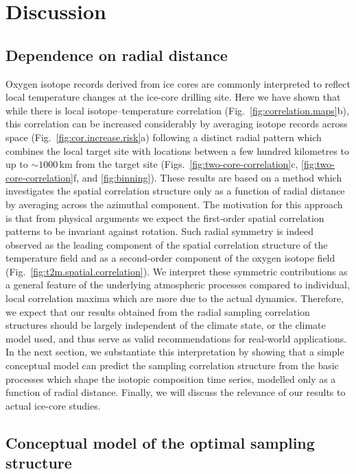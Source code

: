 \documentclass[cp]{copernicus}
\begin{document}
\section{Discussion}\label{discussion}

\subsection{Dependence on radial distance}
\label{discussion:radial.dependence}

Oxygen isotope records derived from ice cores are commonly interpreted to
reflect local temperature changes at the ice-core drilling site. Here we have
shown that while there is local isotope--temperature correlation
(Fig.~\ref{fig:correlation.maps}b), this correlation can be increased
considerably by averaging isotope records across space
(Fig.~\ref{fig:cor.increase.risk}a) following a distinct radial pattern which
combines the local target site with locations between a few hundred kilometres
to up to $\sim1000$\,km from the target site
(Figs.~\ref{fig:two-core-correlation}c, \ref{fig:two-core-correlation}f, and
\ref{fig:binning}). These results are based on a method which investigates the
spatial correlation structure only as a function of radial distance by averaging
across the azimuthal component. The motivation for this approach is that from
physical arguments we expect the first-order spatial correlation patterns to be
invariant against rotation. Such radial symmetry is indeed observed as the
leading component of the spatial correlation structure of the temperature field
and as a second-order component of the oxygen isotope field
(Fig.~\ref{fig:t2m.spatial.correlation}). We interpret these symmetric
contributions as a general feature of the underlying atmospheric processes
compared to individual, local correlation maxima which are more due to the
actual dynamics. Therefore, we expect that our results obtained from the radial
sampling correlation structures should be largely independent of the climate
state, or the climate model used, and thus serve as valid recommendations for
real-world applications. In the next section, we substantiate this
interpretation by showing that a simple conceptual model can predict the
sampling correlation structure from the basic processes which shape the isotopic
composition time series, modelled only as a function of radial distance.
Finally, we will discuss the relevance of our results to actual ice-core
studies.

\subsection{Conceptual model of the optimal sampling structure}
\label{discussion:concept.model}
\end{document}
